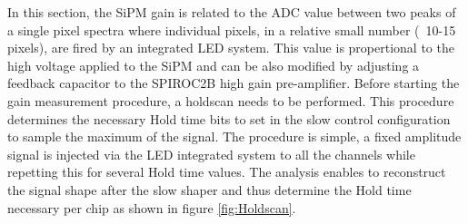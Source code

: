 In this section, the SiPM gain is related to the ADC value between two peaks of a single pixel spectra where individual pixels, in a relative small number (~10-15 pixels), are fired by an integrated LED system. This value is propertional to the high voltage applied to the SiPM and can be also modified by adjusting a feedback capacitor to the SPIROC2B high gain pre-amplifier. Before starting the gain measurement procedure, a holdscan needs to be performed. This procedure determines the necessary Hold time bits to set in the slow control configuration to sample the maximum of the signal. The procedure is simple, a fixed amplitude signal is injected via the LED integrated system to all the channels while repetting this for several Hold time values. The analysis enables to reconstruct the signal shape after the slow shaper and thus determine the Hold time necessary per chip as shown in figure \ref{fig:Holdscan}.


